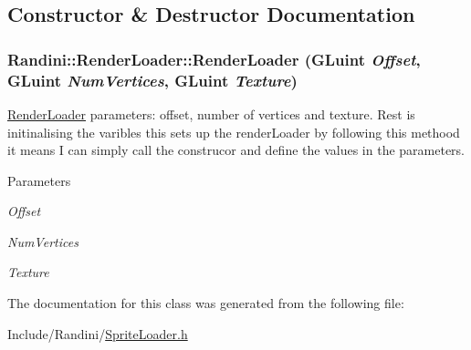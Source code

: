 \subsection{Constructor \& Destructor Documentation}
\hypertarget{classRandini_1_1RenderLoader_ab6e4698f79e43ddc17780a5d6f69c3c8}{
\subsubsection[{RenderLoader}]{\setlength{\rightskip}{0pt plus 5cm}Randini::RenderLoader::RenderLoader (GLuint {\em Offset}, \/  GLuint {\em NumVertices}, \/  GLuint {\em Texture})}}
\label{classRandini_1_1RenderLoader_ab6e4698f79e43ddc17780a5d6f69c3c8}


\hyperlink{classRandini_1_1RenderLoader}{RenderLoader} parameters: offset, number of vertices and texture. Rest is initinalising the varibles this sets up the renderLoader by following this methood it means I can simply call the construcor and define the values in the parameters. 
\begin{DoxyParams}{Parameters}
\item[{\em Offset}]\item[{\em NumVertices}]\item[{\em Texture}]\end{DoxyParams}


The documentation for this class was generated from the following file:\begin{DoxyCompactItemize}
\item 
Include/Randini/\hyperlink{SpriteLoader_8h}{SpriteLoader.h}\end{DoxyCompactItemize}
